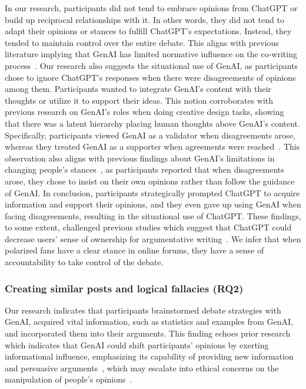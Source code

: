 In our research, participants did not tend to embrace opinions from ChatGPT or build up reciprocal relationships with it. In other words, they did not tend to adapt their opinions or stances to fulfill ChatGPT's expectations. Instead, they tended to maintain control over the entire debate. This aligns with previous literature implying that GenAI has limited normative influence on the co-writing process~\cite{jakesch_co-writing_2023}. Our research also suggests the situational use of GenAI, as participants chose to ignore ChatGPT's responses when there were disagreements of opinions among them. Participants wanted to integrate GenAI's content with their thoughts or utilize it to support their ideas. This notion corroborates with previous research on GenAI's roles when doing creative design tasks, showing that there was a latent hierarchy placing human thoughts above GenAI's content. Specifically, participants viewed GenAI as a validator when disagreements arose, whereas they treated GenAI as a supporter when agreements were reached~\cite{han_when_2024}. This observation also aligns with previous findings about GenAI's limitations in changing people's stances~\cite{tanprasert_debate_2024}, as participants reported that when disagreements arose, they chose to insist on their own opinions rather than follow the guidance of GenAI. In conclusion, participants strategically prompted ChatGPT to acquire information and support their opinions, and they even gave up using GenAI when facing disagreements, resulting in the situational use of ChatGPT. These findings, to some extent, challenged previous studies which suggest that  ChatGPT could decrease users' sense of ownership for argumentative writing~\cite{lee_design_2024, li_value_2024}. We infer that when polarized fans have a clear stance in online forums, they have a sense of accountability to take control of the debate.

\subsubsection{Creating similar posts and logical fallacies (RQ2)}

Our research indicates that participants brainstormed debate strategies with GenAI, acquired vital information, such as statistics and examples from GenAI, and incorporated them into their arguments. This finding echoes prior research which indicates that  GenAI could shift participants' opinions by exerting informational influence, emphasizing its capability of providing new information and persuasive arguments~\cite{jakesch_co-writing_2023}, which may escalate into ethical concerns on the manipulation of people's opinions~\cite{hancock_ai-mediated_2020}.

